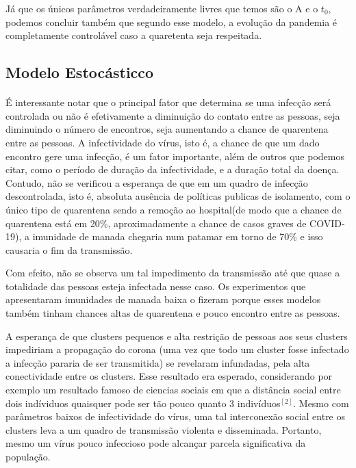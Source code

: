 \documentclass[11pt]{article}
\begin{document}
Já que os únicos parâmetros verdadeiramente livres que temos são o A e o \(t_0\), podemos concluir também que segundo
esse modelo, a evolução da pandemia é completamente controlável caso a quaretenta seja respeitada.
\subsection{Modelo Estocásticco}
\label{sec:orgd325498}
\paragraph{} É interessante notar que o principal fator que determina se uma infecção será controlada ou não é efetivamente a diminuição do contato entre as pessoas, seja diminuindo o número de encontros, seja aumentando a chance de quarentena entre as pessoas. A infectividade do vírus, isto é, a chance de que um dado encontro gere uma infecção, é um fator importante, além de outros que podemos citar, como o período de duração da infectividade, e a duração total da doença. Contudo, não se verificou a esperança de que em um quadro de infecção descontrolada, isto é, absoluta ausência de políticas publicas de isolamento, com o único tipo de quarentena sendo a remoção ao hospital(de modo que a chance de quarentena está em 20\%, aproximadamente a chance de casos graves de COVID-19), a imunidade de manada chegaria num patamar em torno de 70\% e isso causaria o fim da transmissão.

Com efeito, não se observa um tal impedimento da transmissão até que quase a totalidade das pessoas esteja infectada nesse caso. Os experimentos que apresentaram imunidades de manada baixa o fizeram porque esses modelos também tinham chances altas de quarentena e pouco encontro entre as pessoas.

A esperança de que clusters pequenos e alta restrição de pessoas aos seus clusters impediriam a propagação do corona (uma vez que todo um cluster fosse infectado a infecção pararia de ser transmitida) se revelaram infundadas, pela alta conectividade entre os clusters. Esse resultado era esperado, considerando por exemplo um resultado famoso de ciencias sociais em que a distância social entre dois indíviduos quaisquer pode ser tão pouco quanto 3 indivíduos\(^{[2]}\). Mesmo com parâmetros baixos de infectividade do vírus, uma tal interconexão social entre os clusters leva a um quadro de transmissão violenta e disseminada. Portanto, mesmo um vírus pouco infeccioso pode alcançar parcela significativa da população.
\end{document}
